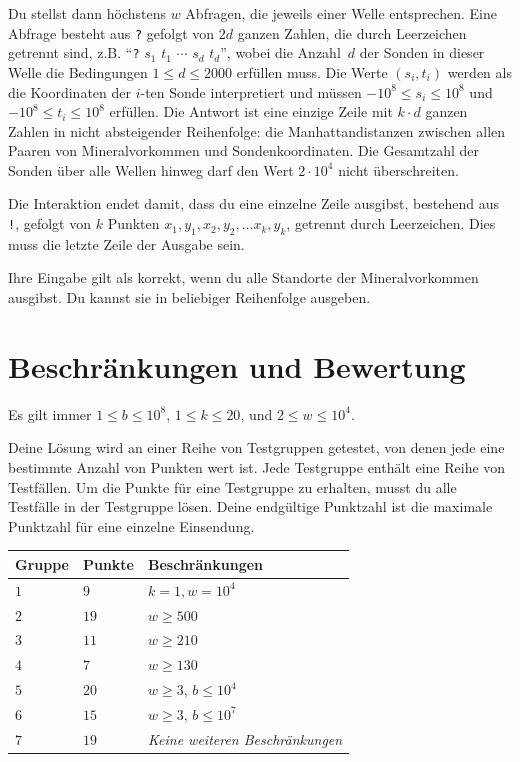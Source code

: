 Du stellst dann höchstens $w$ Abfragen, die jeweils einer Welle entsprechen.
Eine Abfrage besteht aus \texttt{?} gefolgt von $2d$ ganzen Zahlen, die durch Leerzeichen getrennt sind, z.B. ``\texttt{?} $s_1$ $t_1$ $\cdots$ $s_d$ $t_d$'', wobei die Anzahl~$d$ der Sonden in dieser Welle die Bedingungen
$1\leq d\leq 2000$ %
erfüllen muss.
Die Werte $(s_i,t_i)$ werden als die Koordinaten der $i$-ten Sonde interpretiert und müssen
$-10^8 \leq s_i \leq 10^8$ und $-10^8 \leq t_i \leq 10^8$ %
erfüllen.
Die Antwort ist eine einzige Zeile mit $k \cdot d$ ganzen Zahlen in nicht absteigender Reihenfolge: die Manhattandistanzen zwischen allen Paaren von Mineralvorkommen und Sondenkoordinaten.
Die Gesamtzahl der Sonden über alle Wellen hinweg darf den Wert
$2\cdot 10^4$ %
nicht überschreiten.

Die Interaktion endet damit, dass du eine einzelne Zeile ausgibst, bestehend aus \texttt{!}, gefolgt von $k$ Punkten $x_1, y_1, x_2, y_2, \ldots x_k, y_k$, getrennt durch Leerzeichen.
Dies muss die letzte Zeile der Ausgabe sein.

Ihre Eingabe gilt als korrekt, wenn du alle Standorte der Mineralvorkommen ausgibst.
Du kannst sie in beliebiger Reihenfolge ausgeben.

\section*{Beschränkungen und Bewertung}

Es gilt immer
$1\leq b \leq 10^8$, %
$1 \leq k \leq 20$, %
und
$2 \le w \le 10^4$. %

Deine Lösung wird an einer Reihe von Testgruppen getestet, von denen jede eine bestimmte Anzahl von Punkten wert ist.
Jede Testgruppe enthält eine Reihe von Testfällen.
Um die Punkte für eine Testgruppe zu erhalten, musst du alle Testfälle in der Testgruppe lösen.
Deine endgültige Punktzahl ist die maximale Punktzahl für eine einzelne Einsendung.

\medskip
\begin{tabular}{lll}
Gruppe & Punkte & Beschränkungen \\\hline
  $1$ & $9$ & $k = 1, w = 10^4$\\
  $2$ & $19$ & $w \ge 500$\\
  $3$ & $11$ & $w \ge 210$\\
  $4$ & $7$ & $w \ge 130$\\
  $5$ & $20$ & $w \ge 3$, $b \le 10^4$\\
  $6$ & $15$ & $w \ge 3$, $b \le 10^7$\\
  $7$ & $19$ & \emph{Keine weiteren Beschränkungen}
\end{tabular}

